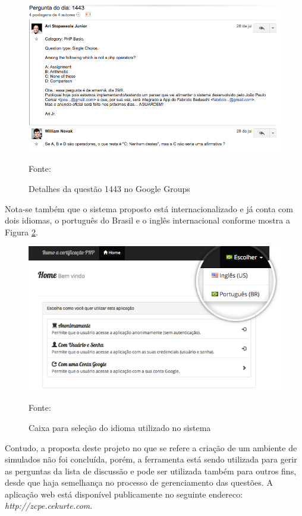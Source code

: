 \begin{figure}[h!tb]
	\caption{Detalhes da questão 1443 no Google Groups}
	\label{fig:zcpePerguntaDetalhesGoogleGroups}

	\centering
	\includegraphics[width=\textwidth]{images/resultados/google-groups-pergunta-1443.png}

	\centering
	\footnotesize Fonte: \fonteOAutor
\end{figure}

\FloatBarrier 	%
				
Nota-se também que o sistema proposto está internacionalizado e já conta com
dois idiomas, o português do Brasil e o inglês internacional conforme mostra a
Figura \ref{fig:zcpeIdioma}.

\begin{figure}[h!tb]
	\caption{Caixa para seleção do idioma utilizado no sistema}
	\label{fig:zcpeIdioma}

	\centering
	\includegraphics[width=\textwidth]{images/resultados/zcpe-idioma.png}

	\centering
	\footnotesize Fonte: \fonteOAutor
\end{figure}

\FloatBarrier 	%

Contudo, a proposta deste projeto no que se refere a criação de um ambiente de
simulados não foi concluída, porém, a ferramenta está sendo utilizada para gerir
as perguntas da lista de discussão e pode ser utilizada também para outros fins,
desde que haja semelhança no processo de gerenciamento das questões. A aplicação
web está disponível publicamente no seguinte endereco: \textit{http://zcpe.cekurte.com}.

